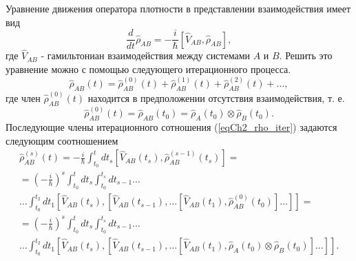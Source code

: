 Уравнение движения оператора плотности в представлении взаимодействия
имеет вид 
\[
\frac{d}{d t}\hat{\rho}_{AB} = 
- \frac{i}{\hbar}\left[\hat{V}_{AB}, \hat{\rho}_{AB}\right],
\]
где $\hat{V}_{AB}$ - гамильтониан взаимодействия между системами $A$ 
и $B$.  Решить это уравнение можно с помощью следующего итерационного процесса.
\begin{equation}
\hat{\rho}_{AB}\left(t\right) = 
\hat{\rho}^{(0)}_{AB}\left(t\right) +
\hat{\rho}^{(1)}_{AB}\left(t\right) +
\hat{\rho}^{(2)}_{AB}\left(t\right) + \dots,
\label{eqCh2_rho_iter}
\end{equation}
где член \(\hat{\rho}^{(0)}_{AB}\left(t\right)\) находится в предположении
отсутствия взаимодействия, т. е.
\[
\hat{\rho}^{(0)}_{AB}\left(t\right) = \hat{\rho}_{AB}\left(t_0\right) = 
\hat{\rho}_{A}\left(t_0\right)
\otimes
\hat{\rho}_{B}\left(t_0\right).
\]
Последующие члены итерационного сотношения (\ref{eqCh2_rho_iter}) задаются следующим соотношением
\begin{eqnarray}
\hat{\rho}^{(s)}_{AB}\left(t\right) = - \frac{i}{\hbar}\int_{t_0}^{t} dt_s
\left[\hat{V}_{AB}\left(t_s\right), \hat{\rho}^{(s - 1)}_{AB}\left(t_s\right)
\right] = 
\nonumber \\
= \left(- \frac{i}{\hbar}\right)^{s}\int_{t_0}^{t} dt_{s}
\int_{t_0}^{t_s} dt_{s -1} \dots
\nonumber \\
\dots \int_{t_0}^{t_2} dt_1 
\left[\hat{V}_{AB}\left(t_s\right), 
\left[\hat{V}_{AB}\left(t_{s -1}\right),
\dotsc
\left[\hat{V}_{AB}\left(t_1\right),
\hat{\rho}^{(0)}_{AB}\left(t_0\right)
\right]
\dots
\right]
\right] =
\nonumber \\
= \left(- \frac{i}{\hbar}\right)^{s}\int_{t_0}^{t} dt_{s}
\int_{t_0}^{t_{s}} dt_{s - 1} \dots
\nonumber \\
\dots \int_{t_0}^{t_2} dt_1 
\left[\hat{V}_{AB}\left(t_s\right), 
\left[\hat{V}_{AB}\left(t_{s-1}\right),
\dotsc
\left[\hat{V}_{AB}\left(t_1\right),
\hat{\rho}_{A}\left(t_0\right)
\otimes
\hat{\rho}_{B}\left(t_0\right)
\right]
\dotsc
\right]
\right].
\label{eqCh2_rho_iter_member}
\end{eqnarray}

